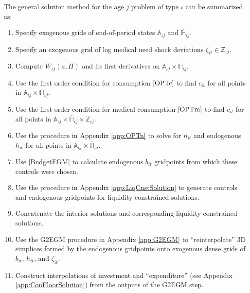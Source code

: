 \documentclass[12pt,pdftex,letterpaper]{article}
\newcommand{\Type}{\iota}
\newcommand{\Health}{h}
\newcommand{\PostHealth}{H}
\newcommand{\PostValue}{W}
\newcommand{\Con}{c}
\newcommand{\Invst}{n}
\newcommand{\Bank}{b}
\newcommand{\Assets}{a}
\newcommand{\Age}{j}
\begin{document}
The general solution method for the age $\Age$ problem of type $\Type$ can be summarized as:
\begin{enumerate}
\item Specify exogenous grids of end-of-period states $\mathbb{A}_{\Type \Age}$ and $\overline{\mathbb{H}}_{\Type \Age}$.

\item Specify an exogenous grid of log medical need shock deviations $\zeta_{it} \in \mathbb{Z}_{\Type \Age}$.

\item Compute $\PostValue_{\Type \Age}(\Assets,\PostHealth)$ and its first derivatives on $\mathbb{A}_{\Type \Age} \times \overline{\mathbb{H}}_{\Type \Age}$.

\item Use the first order condition for consumption $\eqref{OPTc}$ to find $\Con_{it}$ for all points in $\mathbb{A}_{\Type \Age} \times \overline{\mathbb{H}}_{\Type \Age}$.

\item Use the first order condition for medical consumption $\eqref{OPTm}$ to find $\Con_{it}$ for all points in $\mathbb{A}_{\Type \Age} \times \overline{\mathbb{H}}_{\Type \Age} \times \mathbb{Z}_{\Type \Age}$.

\item Use the procedure in Appendix \ref{app:OPTn} to solve for $\Invst_{it}$ and endogenous $\Health_{it}$ for all points in $\mathbb{A}_{\Type \Age} \times \overline{\mathbb{H}}_{\Type \Age}$.

\item Use \eqref{BudgetEGM} to calculate endogenous $\Bank_{it}$ gridpoints from which these controls were chosen.

\item Use the procedure in Appendix \ref{app:LiqCnstSolution} to generate controls and endogenous gridpoints for liquidity constrained solutions.

\item Concatenate the interior solutions and corresponding liquidity constrained solutions.

\item Use the G2EGM procedure in Appendix \ref{app:G2EGM} to ``reinterpolate'' 3D simplices formed by the endogenous gridpoints onto exogenous dense grids of $\Bank_{it}$, $\Health_{it}$, and $\zeta_{it}$.

\item Construct interpolations of investment and ``expenditure'' (see Appendix \ref{app:ConFloorSolution}) from the outputs of the G2EGM step.


\end{enumerate}
\end{document}
